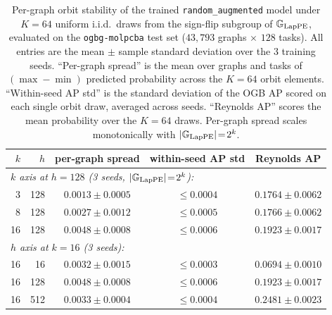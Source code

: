 \documentclass{article}
\begin{document}
\begin{table}[h]
\centering
\caption{Per-graph orbit stability of the trained
\texttt{random\_augmented} model under $K\!=\!64$ uniform i.i.d.\
draws from the sign-flip subgroup of $\mathbb{G}_{\mathrm{LapPE}}$, evaluated
on the \texttt{ogbg-molpcba} test set ($43{,}793$ graphs $\times$
$128$ tasks). All entries are the mean $\pm$ sample standard deviation
over the $3$ training seeds. ``Per-graph spread'' is the mean over
graphs and tasks of $(\max\!-\!\min)$ predicted probability across
the $K\!=\!64$ orbit elements. ``Within-seed AP std'' is the standard
deviation of the OGB AP scored on each single orbit draw, averaged
across seeds. ``Reynolds AP'' scores the mean probability over the
$K\!=\!64$ draws. Per-graph spread scales monotonically with
$|\mathbb{G}_{\mathrm{LapPE}}|\!=\!2^{k}$.}
\label{tab:lpe_molpcba_orbit}
\begin{tabular}{rrccc}
\toprule
$k$ & $h$ & per-graph spread & within-seed AP std & Reynolds AP \\
\midrule
\multicolumn{5}{l}{\emph{$k$ axis at $h\!=\!128$ (3 seeds, $|\mathbb{G}_{\mathrm{LapPE}}|\!=\!2^{k}$):}} \\
 3  & 128 & $0.0013 \pm 0.0005$ & $\le 0.0004$ & $0.1764 \pm 0.0062$ \\
 8  & 128 & $0.0027 \pm 0.0012$ & $\le 0.0005$ & $0.1766 \pm 0.0062$ \\
16  & 128 & $0.0048 \pm 0.0008$ & $\le 0.0006$ & $0.1923 \pm 0.0017$ \\
\midrule
\multicolumn{5}{l}{\emph{$h$ axis at $k\!=\!16$ (3 seeds):}} \\
16  &  16 & $0.0032 \pm 0.0015$ & $\le 0.0003$ & $0.0694 \pm 0.0010$ \\
16  & 128 & $0.0048 \pm 0.0008$ & $\le 0.0006$ & $0.1923 \pm 0.0017$ \\
16  & 512 & $0.0033 \pm 0.0004$ & $\le 0.0004$ & $0.2481 \pm 0.0023$ \\
\bottomrule
\end{tabular}
\end{table}
\end{document}
